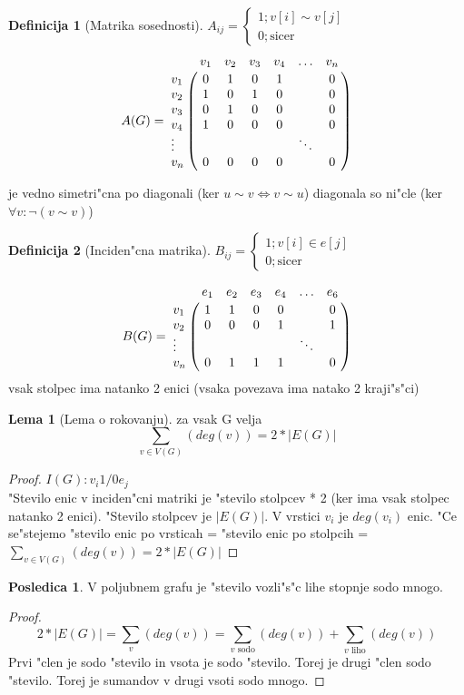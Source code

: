 \documentclass{article}
\let\bbordermatrix\bordermatrix
\theoremstyle{definition}
\newtheorem{definition}{Definicija}[section]
\newtheorem{lemma}{Lema}[section]
\newtheorem{conseq}{Posledica}[section]
\begin{document}
	\begin{definition}[Matrika sosednosti]
	$A_{ij} = \begin{cases}1; v[i] \sim v[j] \\ 0; \text{sicer} \end{cases}$
	$$
		A(G) =
		\bbordermatrix{
			    & v_1 & v_2 & v_3 & v_4 &\ldots& v_n \cr
			v_1 &  0  &  1  &  0  &  1  &      &  0  \cr
			v_2 &  1  &  0  &  1  &  0  &      &  0  \cr
			v_3 &  0  &  1  &  0  &  0  &      &  0  \cr
			v_4 &  1  &  0  &  0  &  0  &      &  0  \cr
		 \vdots &     &     &     &     &\ddots&     \cr
			v_n &  0  &  0  &  0  &  0  &      &  0  \cr
		}
	$$
	\end{definition}
	je vedno simetri"cna po diagonali (ker $u \sim v \iff v \sim u$)
	diagonala so ni"cle (ker $\forall v: \lnot(v \sim v)$)
	
	
	\begin{definition}[Inciden"cna matrika] 
		$B_{ij} = \begin{cases}1; v[i] \in e[j] \\ 0; \text{sicer} \end{cases}$
		
		$$
			B(G) =
			\bbordermatrix{
			    & e_1 & e_2 & e_3 & e_4 &\ldots& e_6 \cr 
			v_1 &  1  &  1  &  0  &  0  &      &  0 \cr 
			v_2 &  0  &  0  &  0  &  1  &      &  1 \cr
		 \vdots &     &     &     &     &\ddots&    \cr
			v_n &  0  &  1  &  1  &  1  &      &  0 \cr
			}
		$$
		vsak stolpec ima natanko 2 enici (vsaka povezava ima natako 2 kraji"s"ci)
	\end{definition}
	
	\begin{lemma}[Lema o rokovanju]
		za vsak G velja
		\[ \sum_{v \in V(G)} (deg(v)) = 2*|E(G)| \]
		\begin{proof}
			$I(G): v_i 1/0 e_j$ \\
			"Stevilo enic v inciden"cni matriki je "stevilo stolpcev * 2 (ker ima vsak stolpec natanko 2 enici). "Stevilo stolpcev je $|E(G)|$.
			V vrstici $v_i$ je $deg(v_i)$ enic. "Ce se"stejemo "stevilo enic po vrsticah = "stevilo enic po stolpcih = $\sum_{v \in V(G)}(deg(v)) = 2*|E(G)|$
		\end{proof}
	\end{lemma}
	
	\begin{conseq} 
		V poljubnem grafu je "stevilo vozli"s"c lihe stopnje sodo mnogo. 
		\begin{proof}
			\[ 2*|E(G)| = \sum_{v}(deg(v)) = \sum_{v \text{ sodo}}(deg(v)) + \sum_{v \text{ liho}}(deg(v)) \] 
			Prvi "clen je sodo "stevilo in vsota je sodo "stevilo. Torej je drugi "clen sodo "stevilo. Torej je sumandov v drugi vsoti sodo mnogo.
		\end{proof}
	\end{conseq}
	
\end{document}
